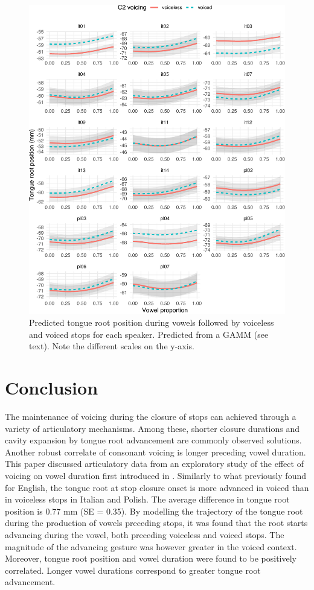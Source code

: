 \documentclass[
  12pt,
]{article}
\begin{document}
\begin{figure}
\includegraphics[width=\linewidth]{2018-tra_files/figure-latex/tra-gam-s-ar-plot-1} \caption{Predicted tongue root position during vowels followed by voiceless and voiced stops for each speaker. Predicted from a GAMM (see text). Note the different scales on the y-axis.}\label{f:tra-gam-s-ar-plot}
\end{figure}

\hypertarget{conclusion}{%
\section{Conclusion}\label{conclusion}}

The maintenance of voicing during the closure of stops can achieved
through a variety of articulatory mechanisms. Among these, shorter
closure durations and cavity expansion by tongue root advancement are
commonly observed solutions. Another robust correlate of consonant
voicing is longer preceding vowel duration. This paper discussed
articulatory data from an exploratory study of the effect of voicing on
vowel duration first introduced in \citet{coretta2018j}. Similarly to
what previously found for English, the tongue root at stop closure onset
is more advanced in voiced than in voiceless stops in Italian and
Polish. The average difference in tongue root position is 0.77 mm (SE =
0.35). By modelling the trajectory of the tongue root during the
production of vowels preceding stops, it was found that the root starts
advancing during the vowel, both preceding voiceless and voiced stops.
The magnitude of the advancing gesture was however greater in the voiced
context. Moreover, tongue root position and vowel duration were found to
be positively correlated. Longer vowel durations correspond to greater
tongue root advancement.
\end{document}
